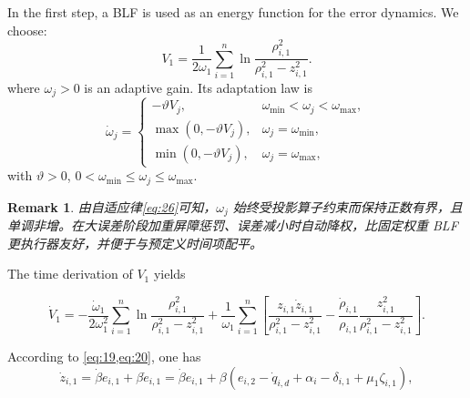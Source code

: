 \documentclass[pdflatex,sn-mathphys-num]{sn-jnl}%
\theoremstyle{thmstyleone}%
\theoremstyle{thmstyletwo}%
\newtheorem{remark}{Remark}%
\theoremstyle{thmstylethree}%
\begin{document}

In the first step, a BLF is used as an energy function for the error dynamics. We choose:
\begin{equation}\label{eq:25}
	V_1= \frac{1}{2 \omega_1}\sum_{i=1}^{n} \ln\frac{\rho_{i,1}^2}{\rho_{i,1}^2-z_{i,1}^2}. 
\end{equation}
where $ \omega_j>0$ is an adaptive gain. Its adaptation law is
\begin{equation}\label{eq:26}
\dot{\omega}_j=\begin{cases}
-\vartheta V_j,& \omega_{\min}<\omega_{j}<\omega_{\max},\\
\max(0,-\vartheta V_j),& \omega_{j}= \omega_{\min},\\
\min(0,-\vartheta V_j),& \omega_{j}= \omega_{\max},
\end{cases}
\end{equation}
with $\vartheta>0$, $ 0 < \omega_{\min} \le \omega_{j} \le \omega_{\max}$.

\begin{remark}
	由自适应律\cref{eq:26}可知，$\omega_{j}$ 始终受投影算子约束而保持正数有界，且单调非增。在大误差阶段加重屏障惩罚、误差减小时自动降权，比固定权重 BLF 更执行器友好，并便于与预定义时间项配平。
\end{remark}
The time derivation of $V_1$ yields 

	\begin{equation}\label{eq:27}
	\dot{V}_{1}=-\frac{\dot{\omega}_{1}}{2 \omega_{1}^{2}}\sum_{i=1}^{n}\ln \frac{\rho_{i,1}^{2}}{\rho_{i,1}^{2}-z_{i,1}^{2}}+\frac{1}{\omega_{1}} \sum_{i=1}^{n} \left[ \frac{z_{i,1} \dot{z}_{i,1}}{\rho_{i,1}^{2} - z_{i,1}^{2}} - \frac{\dot{\rho}_{i,1}}{\rho_{i,1}} \frac{z_{i,1}^{2}}{\rho_{i,1}^{2} - z_{i,1}^{2}} \right].
	\end{equation}

	According to \cref{eq:19,eq:20}, one has
	\begin{equation}	\label{eq:28}
	\dot{z}_{i,1} = \dot{\beta} e_{i,1} + \beta \dot{e}_{i,1}=\dot{\beta} e_{i,1} + \beta (e_{i,2}-\dot q_{i,d}+\alpha_{i}-\delta_{i,1}+\mu_1 \zeta_{i,1}),
	\end{equation}
\end{document}
